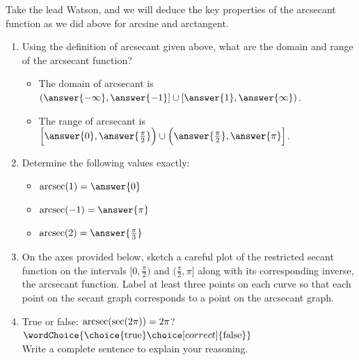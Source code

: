 \documentclass{ximera}
\begin{document}
\begin{problem}
Take the lead Watson, and we will deduce the key properties of the arcsecant function as we did above for arcsine and arctangent.
\begin{enumerate}
\item
Using the definition of arcsecant given above, what are the domain and range of the arcsecant function? \\
\begin{itemize}
\item The domain of arcsecant is $(\answer{-\infty} , \answer{-1}] \cup [\answer{1} , \answer{\infty})$.
%
\item The range of arcsecant is $\Big[\answer{0} , \answer{\frac{\pi}{2}}\Big) \cup \Big(\answer{\frac{\pi}{2}} , \answer{\pi}\Big]$.
\end{itemize}
%
\item Determine the following values exactly: 
\begin{itemize}
%
\item $\arcsec(1) = \answer{0}$
%
\item $\arcsec(-1) = \answer{\pi}$
%
\item $\arcsec(2) = \answer{\frac{\pi}{3}}$ 
\end{itemize}
%
\item
On the axes provided below, sketch a careful plot of the restricted secant function on the intervals $\Big[0, \frac{\pi}{2}\Big)$ and $\Big(\frac{\pi}{2}, \pi\Big]$ along with its corresponding inverse, the arcsecant function.  Label at least three points on each curve so that each point on the secant graph corresponds to a point on the arcsecant graph.  %

%
%
\item True or false: $\operatorname{arcsec}(\sec(2\pi)) = 2\pi$? $\wordChoice{\choice{\text{true}}\choice[correct]{\text{false}}}$ \\
Write a complete sentence to explain your reasoning.%
\end{enumerate}


\end{problem}
\end{document}
